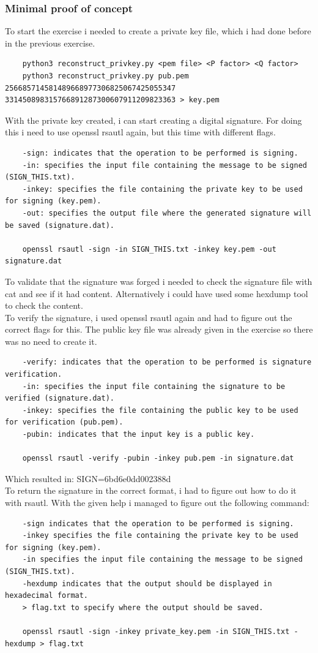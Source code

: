 \subsubsection{Minimal proof of concept}
To start the exercise i needed to create a private key file, which i had done before in the previous exercise.
\begin{verbatim}
	python3 reconstruct_privkey.py <pem file> <P factor> <Q factor>
	python3 reconstruct_privkey.py pub.pem 256685714581489668977306825067425055347 331450898315766891287300607911209823363 > key.pem
\end{verbatim}
With the private key created, i can start creating a digital signature. For doing this i need to use openssl rsautl again,
but this time with different flags.
\begin{verbatim}
	-sign: indicates that the operation to be performed is signing.
	-in: specifies the input file containing the message to be signed (SIGN_THIS.txt).
	-inkey: specifies the file containing the private key to be used for signing (key.pem).
	-out: specifies the output file where the generated signature will be saved (signature.dat).

	openssl rsautl -sign -in SIGN_THIS.txt -inkey key.pem -out signature.dat
\end{verbatim}
To validate that the signature was forged i needed to check the signature file with cat and see if it had content. Alternatively
i could have used some hexdump tool to check the content.
\\
To verify the signature, i used openssl rsautl again and had to figure out the correct flags for this.
The public key file was already given in the exercise so there was no need to create it.
\begin{verbatim}
	-verify: indicates that the operation to be performed is signature verification.
	-in: specifies the input file containing the signature to be verified (signature.dat).
	-inkey: specifies the file containing the public key to be used for verification (pub.pem).
	-pubin: indicates that the input key is a public key.

	openssl rsautl -verify -pubin -inkey pub.pem -in signature.dat
\end{verbatim}
Which resulted in: SIGN=6bd6e0dd002388d
\\
To return the signature in the correct format, i had to figure out how to do it with rsautl. With the given help i 
managed to figure out the following command:
\begin{verbatim}
	-sign indicates that the operation to be performed is signing.
	-inkey specifies the file containing the private key to be used for signing (key.pem).
	-in specifies the input file containing the message to be signed (SIGN_THIS.txt).
	-hexdump indicates that the output should be displayed in hexadecimal format.
	> flag.txt to specify where the output should be saved.

	openssl rsautl -sign -inkey private_key.pem -in SIGN_THIS.txt -hexdump > flag.txt
\end{verbatim}
